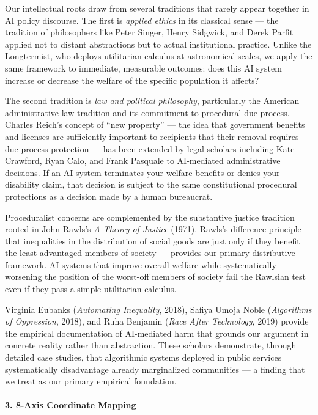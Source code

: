 Our intellectual roots draw from several traditions that rarely appear
together in AI policy discourse. The first is \emph{applied ethics} in
its classical sense --- the tradition of philosophers like Peter Singer,
Henry Sidgwick, and Derek Parfit applied not to distant abstractions but
to actual institutional practice. Unlike the Longtermist, who deploys
utilitarian calculus at astronomical scales, we apply the same framework
to immediate, measurable outcomes: does this AI system increase or
decrease the welfare of the specific population it affects?

The second tradition is \emph{law and political philosophy},
particularly the American administrative law tradition and its
commitment to procedural due process. Charles Reich's concept of ``new
property'' --- the idea that government benefits and licenses are
sufficiently important to recipients that their removal requires due
process protection --- has been extended by legal scholars including
Kate Crawford, Ryan Calo, and Frank Pasquale to AI-mediated
administrative decisions. If an AI system terminates your welfare
benefits or denies your disability claim, that decision is subject to
the same constitutional procedural protections as a decision made by a
human bureaucrat.

Proceduralist concerns are complemented by the substantive justice
tradition rooted in John Rawls's \emph{A Theory of Justice} (1971).
Rawls's difference principle --- that inequalities in the distribution
of social goods are just only if they benefit the least advantaged
members of society --- provides our primary distributive framework. AI
systems that improve overall welfare while systematically worsening the
position of the worst-off members of society fail the Rawlsian test even
if they pass a simple utilitarian calculus.

Virginia Eubanks (\emph{Automating Inequality}, 2018), Safiya Umoja
Noble (\emph{Algorithms of Oppression}, 2018), and Ruha Benjamin
(\emph{Race After Technology}, 2019) provide the empirical documentation
of AI-mediated harm that grounds our argument in concrete reality rather
than abstraction. These scholars demonstrate, through detailed case
studies, that algorithmic systems deployed in public services
systematically disadvantage already marginalized communities --- a
finding that we treat as our primary empirical foundation.

\paragraph{3. 8-Axis Coordinate
Mapping}\label{axis-coordinate-mapping-5}


